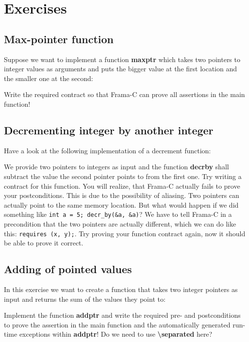 \section{Exercises}

\subsection{Max-pointer function}

Suppose we want to implement a function \textbf{max\textunderscore ptr} which takes two pointers to integer values as arguments and puts the bigger value at the first location and the smaller one at the second: 


Write the required contract so that Frama-C can prove all assertions in the main function! 

\subsection{Decrementing integer by another integer}

Have a look at the following implementation of a decrement function:


We provide two pointers to integers as input and the function \textbf{decr\textunderscore by} shall subtract the value the second pointer points to from the first one. Try writing a contract for this function. You will realize, that Frama-C actually fails to prove your postconditions. This is due to the possibility of aliasing. Two pointers can actually point to the same memory location. But what would happen if we did something like \texttt{int a = 5; decr_by(&a, &a)}? We have to tell Frama-C in a precondition that the two pointers are actually different, which we can do like this: \texttt{requires \separated (x, y);}. Try proving your function contract again, now it should be able to prove it correct. 

\subsection{Adding of pointed values}

In this exercise we want to create a function that takes two integer pointers as input and returns the sum of the values they point to:


Implement the function \textbf{add\textunderscore ptr} and write the required pre- and postconditions to prove the assertion in the main function and the automatically generated run-time exceptions within \textbf{add\textunderscore ptr}! Do we need to use \textbf{\textbackslash separated} here? 
